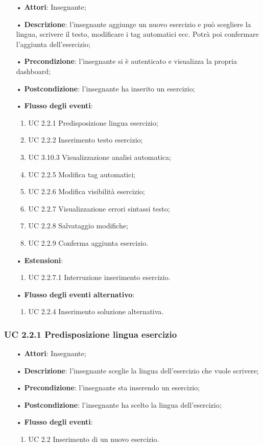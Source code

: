 \begin{itemize}
	\item[•] \textbf{Attori}: Insegnante;
	\item[•] \textbf{Descrizione}: l'insegnante aggiunge un nuovo esercizio e può scegliere la lingua, scrivere il testo,
modificare i tag automatici ecc. Potrà poi confermare l'aggiunta dell'esercizio;
	\item[•] \textbf{Precondizione}: l'insegnante si è autenticato e visualizza la propria dashboard;
	\item[•] \textbf{Postcondizione}: l'insegnante ha inserito un esercizio;
	\item[•] \textbf{Flusso degli eventi}:
	\begin{enumerate}
		\item UC 2.2.1 Predisposizione lingua esercizio;
		\item UC 2.2.2 Inserimento testo esercizio;
		\item UC 3.10.3  Visualizzazione analisi automatica;
		\item UC 2.2.5 Modifica tag automatici;
		\item UC 2.2.6 Modifica visibilità esercizio;
		\item UC 2.2.7 Visualizzazione errori sintassi testo;
		\item UC 2.2.8 Salvataggio modifiche;
		\item UC 2.2.9 Conferma aggiunta esercizio.
	\end{enumerate}
	\item[•] \textbf{Estensioni}:	
	\begin{enumerate}
		\item UC 2.2.7.1 Interruzione inserimento esercizio.
	\end{enumerate}
	\item[•] \textbf{Flusso degli eventi alternativo}:
	\begin{enumerate}
		\item UC 2.2.4 Inserimento soluzione alternativa.
	\end{enumerate}
\end{itemize}

\subsubsection{UC 2.2.1 Predisposizione lingua esercizio}
\begin{itemize}
	\item[•] \textbf{Attori}: Insegnante;
	\item[•] \textbf{Descrizione}: l'insegnante sceglie la lingua dell’esercizio che vuole scrivere;
	\item[•] \textbf{Precondizione}: l'insegnante sta inserendo un esercizio;
	\item[•] \textbf{Postcondizione}: l'insegnante ha scelto la lingua dell'esercizio;
	\item[•] \textbf{Flusso degli eventi}: 
	\begin{enumerate}
		\item UC 2.2 Inserimento di un nuovo esercizio.	
	\end{enumerate}
\end{itemize}

